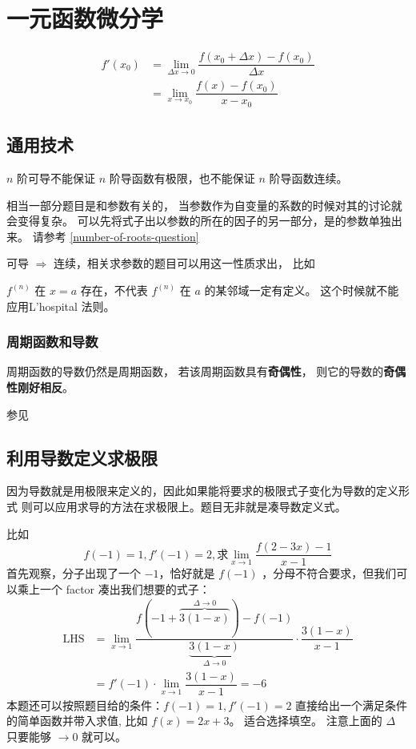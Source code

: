 \twocolumn
\chapter{一元函数微分学}

\begin{definition}
\begin{align}
	f'(x_0) &= \lim_{\Delta x \to 0} \dfrac{f(x_0+\Delta x) - f(x_0)}{\Delta x} \\
	        &= \lim_{x \to x_0} \dfrac{f(x) - f(x_0)}{x - x_0}
\end{align}
\end{definition}

\section{通用技术}

$n$ 阶可导不能保证 $n$ 阶导函数有极限，也不能保证 $n$ 阶导函数连续。

相当一部分题目是和参数有关的，
当参数作为自变量的系数的时候对其的讨论就会变得复杂。
可以先将式子出以参数的所在的因子的另一部分，是的参数单独出来。
请参考 \ref{number-of-roots-question}

可导 $\Rightarrow$ 连续，相关求参数的题目可以用这一性质求出，
比如 \cite[quest27]{w660}

$f^{(n)}$ 在 $x = a$ 存在，不代表 $f^{(n)}$ 在 $a$ 的某邻域一定有定义。
这个时候就不能应用L'hospital 法则。

\subsection{周期函数和导数}

周期函数的导数仍然是周期函数，
若该周期函数具有\textbf{奇偶性}，
则它的导数的\textbf{奇偶性刚好相反}。

参见 \cite[quest29]{w660}

\section{利用导数定义求极限}

因为导数就是用极限来定义的，因此如果能将要求的极限式子变化为导数的定义形式
则可以应用求导的方法在求极限上。题目无非就是凑导数定义式。

比如
\[
	f(-1) = 1, f'(-1) = 2, \mbox{求} \lim_{x \to 1 } \dfrac{f(2-3x) - 1}{x-1}
\]
首先观察，分子出现了一个 $-1$，恰好就是 $f(-1)$ ，分母不符合要求，但我们可以乘上一个 factor
凑出我们想要的式子：
\begin{align*}
	\mbox{LHS} &= \lim_{x \to 1 } \dfrac{f(-1+\overbrace{3(1-x)}^{\Delta \to 0}) -
		 f(-1)}{\underbrace{3(1-x)}_{\Delta \to 0}} \cdot \dfrac{3(1-x)}{x-1} \\
		 &= f'(-1) \cdot \lim_{x \to 1} \dfrac{3(1-x)}{x-1} = -6
\end{align*}
本题还可以按照题目给的条件：$f(-1) = 1, f'(-1) = 2$ 直接给出一个满足条件的简单函数并带入求值,
比如 $f(x) = 2x+3$。
适合选择填空。
注意上面的 $\Delta$ 只要能够 $\to 0$ 就可以。

